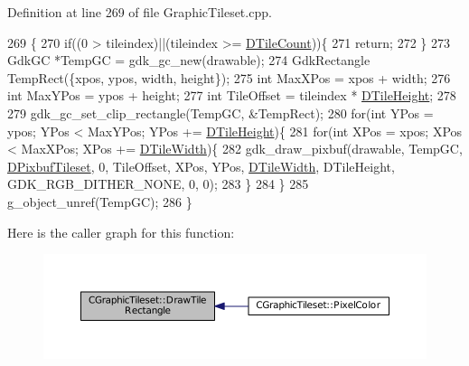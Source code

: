 Definition at line 269 of file Graphic\+Tileset.\+cpp.


\begin{DoxyCode}
269                                                                                                            
                     \{
270     \textcolor{keywordflow}{if}((0 > tileindex)||(tileindex >= \hyperlink{classCGraphicTileset_a39d942b370e47f441bf97385eb1037c8}{DTileCount}))\{
271         \textcolor{keywordflow}{return};
272     \}
273     GdkGC *TempGC = gdk\_gc\_new(drawable);
274     GdkRectangle TempRect(\{xpos, ypos, width, height\});
275     \textcolor{keywordtype}{int} MaxXPos = xpos + width;
276     \textcolor{keywordtype}{int} MaxYPos = ypos + height;
277     \textcolor{keywordtype}{int} TileOffset = tileindex * \hyperlink{classCGraphicTileset_af48f32e07d5fe69afd5f764318cc3244}{DTileHeight};
278     
279     gdk\_gc\_set\_clip\_rectangle(TempGC, &TempRect);
280     \textcolor{keywordflow}{for}(\textcolor{keywordtype}{int} YPos = ypos; YPos < MaxYPos; YPos += \hyperlink{classCGraphicTileset_af48f32e07d5fe69afd5f764318cc3244}{DTileHeight})\{
281         \textcolor{keywordflow}{for}(\textcolor{keywordtype}{int} XPos = xpos; XPos < MaxXPos; XPos += \hyperlink{classCGraphicTileset_a2d0c7d19865b81911a3a43d5cae50e00}{DTileWidth})\{
282             gdk\_draw\_pixbuf(drawable, TempGC, \hyperlink{classCGraphicTileset_a5d5adfcdbb347a6df3f57535ca08e3ef}{DPixbufTileset}, 0, TileOffset, XPos, YPos, 
      \hyperlink{classCGraphicTileset_a2d0c7d19865b81911a3a43d5cae50e00}{DTileWidth}, DTileHeight, GDK\_RGB\_DITHER\_NONE, 0, 0);
283         \}
284     \}
285     g\_object\_unref(TempGC);
286 \}
\end{DoxyCode}
Here is the caller graph for this function\+:
\nopagebreak
\begin{figure}[H]
\begin{center}
\leavevmode
\includegraphics[width=350pt]{classCGraphicTileset_a81114be934d1efca29eb194fc2429658_icgraph}
\end{center}
\end{figure}
\hypertarget{classCGraphicTileset_a78db70086b4cd1085fd3b5d0d0dc5fdd}{}\label{classCGraphicTileset_a78db70086b4cd1085fd3b5d0d0dc5fdd} 
